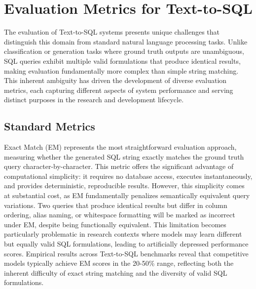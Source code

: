 \section{Evaluation Metrics for Text-to-SQL}

The evaluation of Text-to-SQL systems presents unique challenges that distinguish this domain from standard natural language processing tasks. Unlike classification or generation tasks where ground truth outputs are unambiguous, SQL queries exhibit multiple valid formulations that produce identical results, making evaluation fundamentally more complex than simple string matching. This inherent ambiguity has driven the development of diverse evaluation metrics, each capturing different aspects of system performance and serving distinct purposes in the research and development lifecycle.

\subsection{Standard Metrics}

Exact Match (EM) represents the most straightforward evaluation approach, measuring whether the generated SQL string exactly matches the ground truth query character-by-character. This metric offers the significant advantage of computational simplicity: it requires no database access, executes instantaneously, and provides deterministic, reproducible results. However, this simplicity comes at substantial cost, as EM fundamentally penalizes semantically equivalent query variations. Two queries that produce identical results but differ in column ordering, alias naming, or whitespace formatting will be marked as incorrect under EM, despite being functionally equivalent. This limitation becomes particularly problematic in research contexts where models may learn different but equally valid SQL formulations, leading to artificially depressed performance scores. Empirical results across Text-to-SQL benchmarks reveal that competitive models typically achieve EM scores in the 20-50\% range, reflecting both the inherent difficulty of exact string matching and the diversity of valid SQL formulations.

